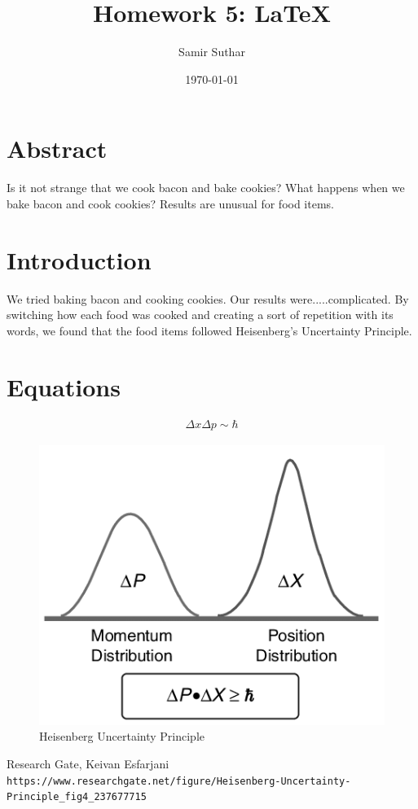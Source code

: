 \documentclass[aps,12pt]{revtex4}
\begin{document}
\title{Homework 5: LaTeX}

\author{Samir Suthar}


\date{\today}

\maketitle

\section{Abstract}

Is it not strange that we cook bacon and bake cookies? What happens when we bake bacon and cook cookies? Results are unusual for food items.

\section{Introduction}

We tried baking bacon and cooking cookies. Our results were.....complicated. By switching how each food was cooked and creating a sort of repetition with its words, we found that the food items followed Heisenberg's Uncertainty Principle.

\section{Equations}
\begin{eqnarray}
\Delta x\Delta p \sim \hbar
\end{eqnarray}

\begin{figure}[h]
\centerline{
\includegraphics[width=4.5in]{Heisenberg-Uncertainty-Principle.png}
}
\caption{Heisenberg Uncertainty Principle}\label{fig:arb}
\end{figure}

\begin{thebibliography}{9}
Research Gate, Keivan Esfarjani
\\\texttt{https://www.researchgate.net/figure/Heisenberg-Uncertainty-Principle\_fig4\_237677715}
\end{thebibliography}
\end{document}
